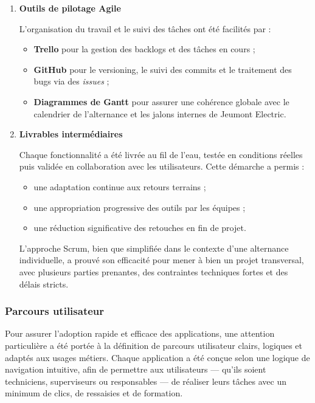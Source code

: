 \documentclass[11pt,a4paper]{article}
\begin{document}
\begin{enumerate}
\item \textbf{Outils de pilotage Agile}

L'organisation du travail et le suivi des tâches ont été facilités par :
\begin{itemize}
    \item \textbf{Trello} pour la gestion des backlogs et des tâches en cours ;
    \item \textbf{GitHub} pour le versioning, le suivi des commits et le traitement des bugs via des \textit{issues} ;
    \item \textbf{Diagrammes de Gantt} pour assurer une cohérence globale avec le calendrier de l’alternance et les jalons internes de Jeumont Electric.
\end{itemize}

\item \textbf{Livrables intermédiaires}

Chaque fonctionnalité a été livrée au fil de l’eau, testée en conditions réelles puis validée en collaboration avec les utilisateurs. Cette démarche a permis :
\begin{itemize}
    \item une adaptation continue aux retours terrains ;
    \item une appropriation progressive des outils par les équipes ;
    \item une réduction significative des retouches en fin de projet.
\end{itemize}

L’approche Scrum, bien que simplifiée dans le contexte d’une alternance individuelle, a prouvé son efficacité pour mener à bien un projet transversal, avec plusieurs parties prenantes, des contraintes techniques fortes et des délais stricts.
\end{enumerate}


\subsubsection{Parcours utilisateur}

Pour assurer l’adoption rapide et efficace des applications, une attention particulière a été portée à la définition de parcours utilisateur clairs, logiques et adaptés aux usages métiers. Chaque application a été conçue selon une logique de navigation intuitive, afin de permettre aux utilisateurs — qu’ils soient techniciens, superviseurs ou responsables — de réaliser leurs tâches avec un minimum de clics, de ressaisies et de formation.
\end{document}
